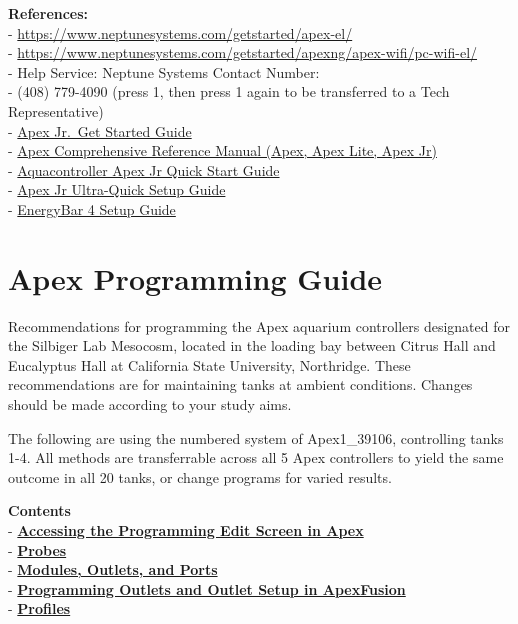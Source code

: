 \documentclass[
]{book}
\begin{document}
\textbf{References:}\\
- \url{https://www.neptunesystems.com/getstarted/apex-el/}\\
- \url{https://www.neptunesystems.com/getstarted/apexng/apex-wifi/pc-wifi-el/}\\
- Help Service: Neptune Systems Contact Number:\\
- (408) 779-4090 (press 1, then press 1 again to be transferred to a Tech Representative)\\
- \href{https://www.neptunesystems.com/getstarted/apexjr/}{Apex Jr.~Get Started Guide}\\
- \href{https://www.neptunesystems.com/downloads/docs/Comprehensive_Reference_Manual.pdf}{Apex Comprehensive Reference Manual (Apex, Apex Lite, Apex Jr)}\\
- \href{https://www.neptunesystems.com/downloads/docs/AquaController-Apex-Jr-Quickstart.pdf}{Aquacontroller Apex Jr Quick Start Guide}\\
- \href{https://www.neptunesystems.com/downloads/docs/Quick-Start-Apex-Jr-Fullsheet-v1-web.pdf}{Apex Jr Ultra-Quick Setup Guide}\\
- \href{https://www.neptunesystems.com/downloads/docs/EB4_manual.pdf}{EnergyBar 4 Setup Guide}

\hypertarget{apex-programming-guide}{%
\chapter{Apex Programming Guide}\label{apex-programming-guide}}

Recommendations for programming the Apex aquarium controllers designated for the Silbiger Lab Mesocosm, located in the loading bay between Citrus Hall and Eucalyptus Hall at California State University, Northridge. These recommendations are for maintaining tanks at ambient conditions. Changes should be made according to your study aims.

The following are using the numbered system of Apex1\_39106, controlling tanks 1-4. All methods are transferrable across all 5 Apex controllers to yield the same outcome in all 20 tanks, or change programs for varied results.

\textbf{Contents}\\
- \protect\hyperlink{Programm_Screen}{\textbf{Accessing the Programming Edit Screen in Apex}}\\
- \protect\hyperlink{Probes}{\textbf{Probes}}\\
- \protect\hyperlink{Modules_Outlets_and_Ports}{\textbf{Modules, Outlets, and Ports}}\\
- \protect\hyperlink{Outlet_Setup}{\textbf{Programming Outlets and Outlet Setup in ApexFusion}}\\
- \protect\hyperlink{Profiles}{\textbf{Profiles}}
\end{document}
